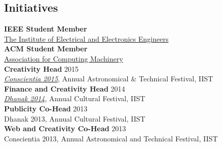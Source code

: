 \documentclass{resume}
\begin{document}
\begin{multicols}{2}

\section{Initiatives}

\textbf{IEEE Student Member}\\
\href{http://www.ieee.org/}{The Institute of Electrical and Electronics Engineers}\\[.05in]
\textbf{ACM Student Member}\\
\href{http://www.acm.org/}{Association for Computing Machinery}\\[.05in]
\textbf{Creativity Head} \hfill 2015\\
\href{https://www.facebook.com/conscientia.iist/}{\emph{Conscientia 2015}}, Annual Astronomical \& Technical Festival, IIST\\[.05in]
\textbf{Finance and Creativity Head} \hfill 2014\\
\href{https://www.facebook.com/iist.dhanak/}{\emph{Dhanak 2014}}, Annual Cultural Festival, IIST\\[.05in]
\textbf{Publicity Co-Head} \hfill 2013\\
Dhanak 2013, Annual Cultural Festival, IIST\\[.05in]
\textbf{Web and Creativity Co-Head} \hfill 2013\\
Conscientia 2013, Annual Astronomical and Technical Festival, IIST\\


\end{multicols}
\end{document}
